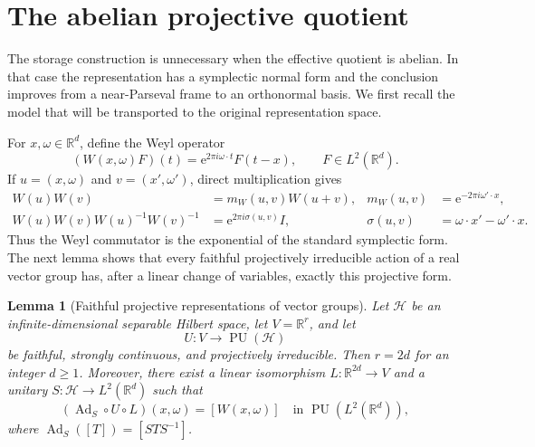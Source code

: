 \documentclass[reqno]{amsart}
\numberwithin{equation}{section}
\newtheorem{lemma}[theorem]{Lemma}
\theoremstyle{definition}
\theoremstyle{remark}
\newcommand{\cH}{\mathcal H}
\newcommand{\R}{\mathbb R}
\newcommand{\PU}{\operatorname{PU}}
\newcommand{\e}{\mathrm e}
\begin{document}
\section{The abelian projective quotient}\label{sec:abelian}

The storage construction is unnecessary when the effective quotient is
abelian.  In that case the representation has a symplectic normal form and
the conclusion improves from a near-Parseval frame to an orthonormal basis.
We first recall the model that will be transported to the original
representation space.

For $x,\omega\in\R^d$, define the Weyl operator
\begin{equation}\label{eq:Weyl-operator}
 (W(x,\omega)F)(t)=\e^{2\pi i\omega\cdot t}F(t-x),
 \qquad F\in L^2(\R^d).
\end{equation}
If $u=(x,\omega)$ and $v=(x',\omega')$, direct multiplication gives
\begin{align}
 W(u)W(v)
 &=m_W(u,v)W(u+v),
 &m_W(u,v)&=\e^{-2\pi i\omega'\cdot x},
                                                        \label{eq:Weyl-multiplier}\\
 W(u)W(v)W(u)^{-1}W(v)^{-1}
 &=\e^{2\pi i\sigma(u,v)}I,
 &\sigma(u,v)&=\omega\cdot x'-\omega'\cdot x.
                                                        \label{eq:Weyl-commutator}
\end{align}
Thus the Weyl commutator is the exponential of the standard symplectic form.
The next lemma shows that every faithful projectively irreducible action of a
real vector group has, after a linear change of variables, exactly this
projective form.

\begin{lemma}[Faithful projective representations of vector groups%
]
\label{lem:projective-vector-group}
Let $\cH$ be an infinite-dimensional separable Hilbert space, let
$V=\R^r$, and let
\[
 U:V\longrightarrow\PU(\cH)
\]
be faithful, strongly continuous, and projectively irreducible.  Then
$r=2d$ for an integer $d\geq1$.  Moreover, there exist a linear isomorphism
$L:\R^{2d}\to V$ and a unitary $S:\cH\to L^2(\R^d)$ such that
\begin{equation}\label{eq:projective-Weyl-equivalence}
 (\operatorname{Ad}_S\circ U\circ L)(x,\omega)
 =[W(x,\omega)]
 \quad\text{in }\PU(L^2(\R^d)),
\end{equation}
where $\operatorname{Ad}_S([T])=[STS^{-1}]$.
\end{lemma}
\end{document}
